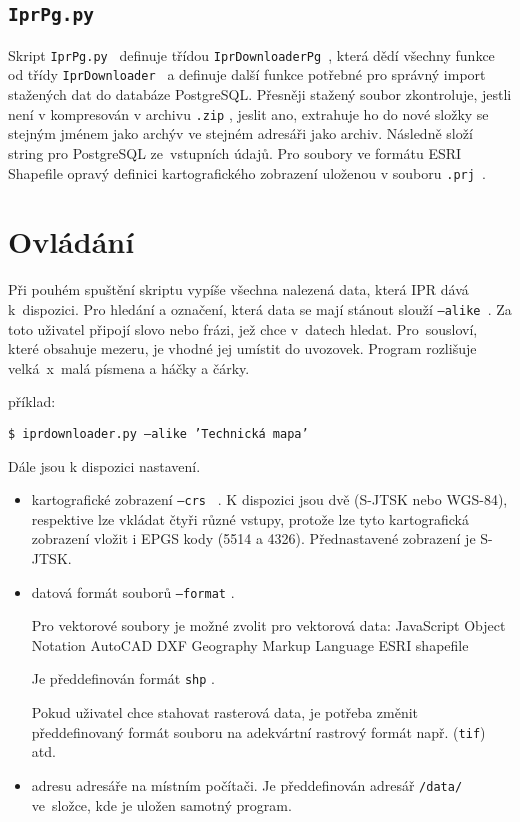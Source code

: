 \subsection{{\tt IprPg.py}}
Skript {\tt IprPg.py } definuje třídou {\tt IprDownloaderPg }, která dědí 
všechny funkce od třídy {\tt IprDownloader } a definuje další funkce potřebné pro 
správný import stažených dat do databáze PostgreSQL. 
Přesněji stažený soubor zkontroluje, jestli není v kompresován v archivu 
{\tt *.zip} , jeslit ano, extrahuje ho do nové složky se stejným jménem jako
archýv ve stejném adresáři jako archiv. Následně složí string pro PostgreSQL 
ze~vstupních údajů. Pro soubory ve formátu ESRI Shapefile opravý definici 
kartografického zobrazení uloženou v souboru {\tt *.prj }. 


\section{Ovládání}
Při pouhém spuštění skriptu vypíše všechna nalezená data, která IPR dává 
k~dispozici. Pro hledání a označení, která data se mají stánout slouží 
{\tt ---alike }. Za toto uživatel připojí slovo nebo frázi, jež chce v~datech
hledat. Pro~sousloví, které obsahuje mezeru, je vhodné jej umístit do uvozovek. 
Program rozlišuje velká~x~malá písmena a háčky a čárky.

příklad:

{\tt \$ iprdownloader.py ---alike 'Technická mapa'}
  

Dále jsou k dispozici nastavení.
\begin{itemize}
    \item kartografické zobrazení {\tt ---crs } . K dispozici jsou dvě
     (S-JTSK nebo WGS-84), respektive lze vkládat čtyři různé vstupy, protože 
     lze tyto kartografická zobrazení vložit i EPGS kody (5514 a 4326). 
     Přednastavené zobrazení je S-JTSK.
    \item datová formát souborů {\tt ---format} .
    
    Pro vektorové soubory je možné zvolit pro vektorová data:
          JavaScript Object Notation
          AutoCAD DXF
          Geography Markup Language
          ESRI shapefile
        
    Je předdefinován formát {\tt shp} .
         
    Pokud uživatel chce stahovat rasterová data, je potřeba změnit předdefinovaný
    formát souboru na adekvártní rastrový formát např. ({\tt tif}) atd.
    
    \item adresu adresáře na místním počítači. Je předdefinován adresář 
    {\tt /data/} ve~složce, kde je uložen samotný program.     
\end{itemize}

